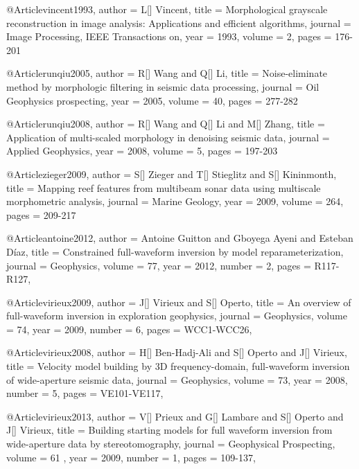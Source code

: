           @Article{vincent1993,
  author = 	 {L[] Vincent},
  title = 	 {Morphological grayscale reconstruction in image analysis: Applications and efficient algorithms},
  journal = 	 {Image Processing, IEEE Transactions on},
  year = 	 1993,
  volume = 	 2,
  pages = 	 {176-201}}  
  
          @Article{runqiu2005,
  author = 	 {R[] Wang and Q[] Li},
  title = 	 {Noise-eliminate method by morphologic filtering in seismic data processing},
  journal = 	 {Oil Geophysics prospecting},
  year = 	 2005,
  volume = 	 40,
  pages = 	 {277-282}}  
  
  
            @Article{runqiu2008,
  author = 	 {R[] Wang and Q[] Li and M[] Zhang},
  title = 	 {Application of multi-scaled morphology in denoising seismic data},
  journal = 	 {Applied Geophysics},
  year = 	 2008,
  volume = 	 5,
  pages = 	 {197-203}}    
 
             @Article{zieger2009,
  author = 	 {S[] Zieger and T[] Stieglitz and S[] Kininmonth},
  title = 	 {Mapping reef features from multibeam sonar data using multiscale morphometric analysis},
  journal = 	 {Marine Geology},
  year = 	 2009,
  volume = 	 264,
  pages = 	 {209-217}}   
  
  
 
 
@Article{antoine2012,
  author =	 { Antoine Guitton and Gboyega Ayeni and Esteban Díaz},
  title =	 {Constrained full-waveform inversion by model reparameterization},
  journal =	 {Geophysics},
  volume =	 77,
  year =	 2012,
  number =	 2,
  pages =	 {R117-R127},
}

@Article{virieux2009,
  author =	 { J[] Virieux and S[] Operto},
  title =	 {An overview of full-waveform inversion in exploration geophysics},
  journal =	 {Geophysics},
  volume =	 74,
  year =	 2009,
  number =	 6,
  pages =	 {WCC1-WCC26},
}

@Article{virieux2008,
  author =	 { H[] Ben-Hadj-Ali and S[] Operto and J[] Virieux},
  title =	 {Velocity model building by 3D frequency-domain, full-waveform inversion of wide-aperture seismic data},
  journal =	 {Geophysics},
  volume =	 73,
  year =	 2008,
  number =	 5,
  pages =	 {VE101-VE117},
}

@Article{virieux2013,
  author =	 { V[] Prieux and G[] Lambare  and S[] Operto and J[] Virieux},
  title =	 {Building starting models for full waveform inversion from wide-aperture data by stereotomography},
  journal =	 {Geophysical Prospecting},
  volume =	61 ,
  year =	 2009,
  number =	 1,
  pages =	 {109-137},
}



